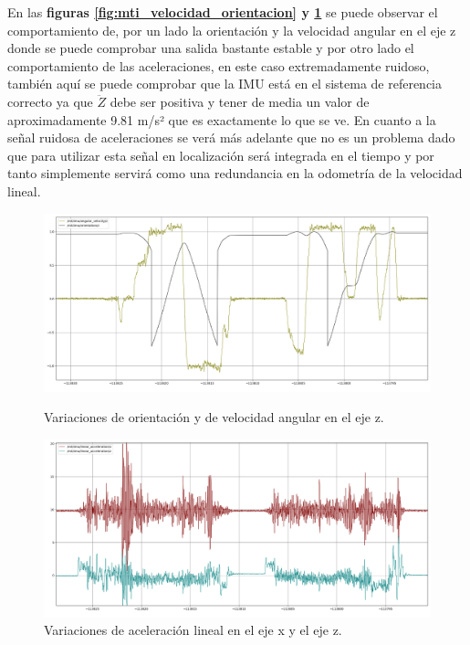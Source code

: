 \newpage
En las \textbf{figuras \ref{fig:mti_velocidad_orientacion} y \ref{fig:mti_aceleraciones}} se puede observar el comportamiento de, por un lado 
la orientación y la velocidad angular en el eje z donde se puede comprobar una salida bastante estable y por otro lado el comportamiento 
de las aceleraciones, en este caso extremadamente ruidoso, también aquí se puede comprobar que la IMU está en el sistema de referencia correcto 
ya que \begin{math}\ddot{Z}\end{math} debe ser positiva y tener de media un valor de aproximadamente 9.81 m/s² que es exactamente lo que se ve. En cuanto a la 
señal ruidosa de aceleraciones se verá más adelante que no es un problema dado que para utilizar esta señal en localización será integrada en el tiempo 
y por tanto simplemente servirá como una redundancia en la odometría de la velocidad lineal.


\begin{figure}[htbp]
  \centering
  \begin{minipage}[b]{0.5\textwidth}
    \centering
    \includegraphics[width=\textwidth]{images/mti_angular_orientation.png}
    \caption{Variaciones de orientación y de velocidad angular en el eje z.}
    \label{fig:mti_velocidad_orientacion}
  \end{minipage}
  \hfill
  \begin{minipage}[b]{0.5\textwidth}
    \centering
    \includegraphics[width=\textwidth]{images/mti_Acceleration.png}
    \caption{Variaciones de aceleración lineal en el eje x y el eje z.}
    \label{fig:mti_aceleraciones}
  \end{minipage}
\end{figure}
\newpage
